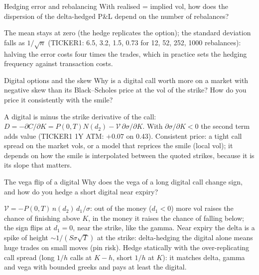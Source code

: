 \begin{question}{\Practice {}}{Hedging error and rebalancing}
With realised = implied vol, how does the dispersion of the delta-hedged P\&L depend on the number of rebalances?
\end{question}
\begin{answer}
The mean stays at zero (the hedge replicates the option); the standard deviation falls as $1/\sqrt n$ (TICKER1:
6.5, 3.2, 1.5, 0.73 for 12, 52, 252, 1000 rebalances): halving the error costs four times the trades, which in practice
sets the hedging frequency against transaction costs.
\end{answer}

\begin{question}{\Theory {}}{Digital options and the skew}
Why is a digital call worth more on a market with negative skew than its Black--Scholes price at the vol of the
strike? How do you price it consistently with the smile? 
\end{question}
\begin{answer}
A digital is minus the strike derivative of the call: $D = -\partial C/\partial K = P(0,T)N(d_2) - \mathcal{V}\,\partial\sigma/\partial K$.
With $\partial\sigma/\partial K < 0$ the second term adds value (TICKER1 1Y ATM: $+0.07$ on 0.43). Consistent price: a tight
call spread on the market vols, or a model that reprices the smile (local vol); it depends on how the smile is
interpolated between the quoted strikes, because it is its slope that matters.
\end{answer}

\begin{question}{\Theory {}}{The vega flip of a digital}
Why does the vega of a long digital call change sign, and how do you hedge a short digital near expiry?
\end{question}
\begin{answer}
$\mathcal{V} = -P(0,T)\,n(d_2)\,d_1/\sigma$: out of the money ($d_1 < 0$) more vol raises the chance of finishing above $K$,
in the money it raises the chance of falling below; the sign flips at $d_1 = 0$, near the strike, like the gamma.
Near expiry the delta is a spike of height $\sim 1/(S\sigma\sqrt T)$ at the strike: delta-hedging the digital alone
means huge trades on small moves (pin risk). Hedge statically with the over-replicating call spread
(long $1/h$ calls at $K-h$, short $1/h$ at $K$): it matches delta, gamma and vega with bounded greeks and pays at least
the digital.
\end{answer}

